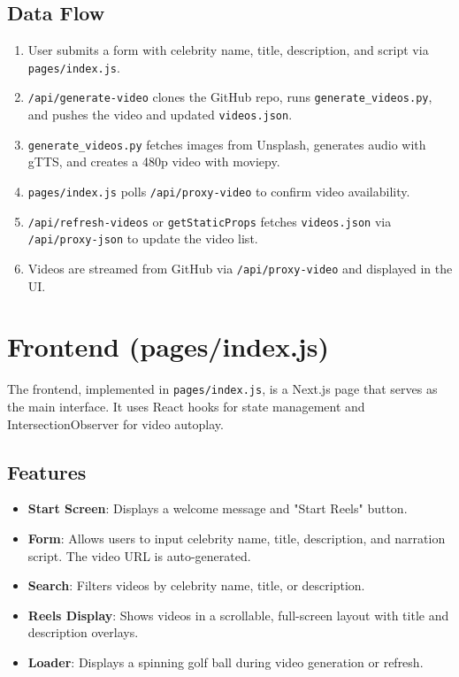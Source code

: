 \documentclass[a4paper,12pt]{article}
\begin{document}
\subsection{Data Flow}
\begin{enumerate}
    \item User submits a form with celebrity name, title, description, and script via \texttt{pages/index.js}.
    \item \texttt{/api/generate-video} clones the GitHub repo, runs \texttt{generate\_videos.py}, and pushes the video and updated \texttt{videos.json}.
    \item \texttt{generate\_videos.py} fetches images from Unsplash, generates audio with gTTS, and creates a 480p video with moviepy.
    \item \texttt{pages/index.js} polls \texttt{/api/proxy-video} to confirm video availability.
    \item \texttt{/api/refresh-videos} or \texttt{getStaticProps} fetches \texttt{videos.json} via \texttt{/api/proxy-json} to update the video list.
    \item Videos are streamed from GitHub via \texttt{/api/proxy-video} and displayed in the UI.
\end{enumerate}

\section{Frontend (pages/index.js)}
The frontend, implemented in \texttt{pages/index.js}, is a Next.js page that serves as the main interface. It uses React hooks for state management and IntersectionObserver for video autoplay.

\subsection{Features}
\begin{itemize}
    \item \textbf{Start Screen}: Displays a welcome message and "Start Reels" button.
    \item \textbf{Form}: Allows users to input celebrity name, title, description, and narration script. The video URL is auto-generated.
    \item \textbf{Search}: Filters videos by celebrity name, title, or description.
    \item \textbf{Reels Display}: Shows videos in a scrollable, full-screen layout with title and description overlays.
    \item \textbf{Loader}: Displays a spinning golf ball during video generation or refresh.
\end{itemize}
\end{document}
